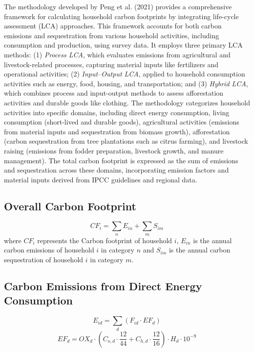 \documentclass[12pt,a4paper]{article}%
\begin{document}
The methodology developed by Peng et al. (2021) provides a comprehensive framework for calculating household carbon footprints by integrating life-cycle assessment (LCA) approaches. This framework accounts for both carbon emissions and sequestration from various household activities, including consumption and production, using survey data. It employs three primary LCA methods: (1) \textit{Process LCA}, which evaluates emissions from agricultural and livestock-related processes, capturing material inputs like fertilizers and operational activities; (2) \textit{Input–Output LCA}, applied to household consumption activities such as energy, food, housing, and transportation; and (3) \textit{Hybrid LCA}, which combines process and input-output methods to assess afforestation activities and durable goods like clothing. The methodology categorizes household activities into specific domains, including direct energy consumption, living consumption (short-lived and durable goods), agricultural activities (emissions from material inputs and sequestration from biomass growth), afforestation (carbon sequestration from tree plantations such as citrus farming), and livestock raising (emissions from fodder preparation, livestock growth, and manure management). The total carbon footprint is expressed as the sum of emissions and sequestration across these domains, incorporating emission factors and material inputs derived from IPCC guidelines and regional data. 
\subsection{Overall Carbon Footprint}
\begin{equation}
CF_i = \sum_{n} E_{in} + \sum_{m} S_{im}
\end{equation}
where $CF_i$ represents the Carbon footprint of household $i$, $E_{in}$ is the annual carbon emissions of household $i$ in category $n$ and $S_{im}$ is the annual carbon sequestration of household $i$ in category $m$.


\subsection{Carbon Emissions from Direct Energy Consumption}
\begin{equation}
E_{id} = \sum_d (F_{id} \cdot EF_d)
\end{equation}
\begin{equation}
EF_d = OX_d \cdot \left(C_{o,d} \cdot \frac{12}{44} + C_{h,d} \cdot \frac{12}{16}\right) \cdot H_d \cdot 10^{-9}
\end{equation}
\end{document}
